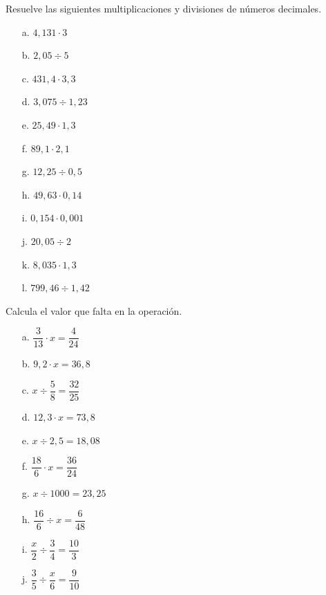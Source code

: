 \documentclass[spanish,letterpaper, 11pt, addpoints, answers]{exam}
\begin{document}
\begin{questions}
\question Resuelve las siguientes multiplicaciones y divisiones de números decimales.

\begin{multicols}{2}
    
 
  \begin{itemize}
    \item[a.] $4{,}131\cdot 3$
    \item[b.] $2{,}05\div 5$
    \item[c.] $431{,}4\cdot 3{,}3$
    \item[d.] $3{,}075\div 1{,}23$
    \item[e.] $25{,}49\cdot 1{,}3$
    \item[f.] $89{,}1\cdot 2{,}1$
    \item[g.] $12{,}25\div 0{,}5$
    \item[h.] $49{,}63\cdot 0{,}14$
    \item[i.] $0{,}154\cdot 0{,}001$
    \item[j.] $20{,}05\div 2$
    \item[k.] $8{,}035\cdot 1{,}3$
    \item[l.] $799{,}46\div 1 {,}42$
  \end{itemize}
 \end{multicols}

\question Calcula el valor que falta en la operación.

\begin{multicols}{2}

\begin{itemize}
  \item[a.] $\dfrac{3}{13}\cdot x=\dfrac{4}{24}$
  \item[b.] $9{,}2\cdot x=36{,}8$
  \item[c.] $x\div \dfrac{5}{8}=\dfrac{32}{25}$
  \item[d.] $12{,}3\cdot x=73{,}8$
  \item[e.] $x\div 2{,}5=18{,}08$
  \item[f.] $\dfrac{18}{6}\cdot x=\dfrac{36}{24}$
  \item[g.] $x\div 1000=23{,}25$
  \item[h.] $\dfrac{16}{6}\div x=\dfrac{6}{48}$
  \item[i.] $\dfrac{x}{2}\div \dfrac{3}{4}=\dfrac{10}{3}$
  \item[j.] $\dfrac{3}{5}\div \dfrac{x}{6}=\dfrac{9}{10}$
  
\end{itemize}
\end{multicols}


\end{questions}
\end{document}
